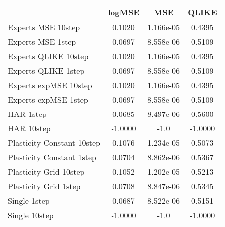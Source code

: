 
\begin{tabular}{l|c|c|c}
    & logMSE & MSE & QLIKE \\\hline
Experts MSE 10step & 0.1020 & 1.166e-05 & 0.4395\\ 
Experts MSE 1step & 0.0697 & 8.558e-06 & 0.5109\\ 
Experts QLIKE 10step & 0.1020 & 1.166e-05 & 0.4395\\ 
Experts QLIKE 1step & 0.0697 & 8.558e-06 & 0.5109\\ 
Experts expMSE 10step & 0.1020 & 1.166e-05 & 0.4395\\ 
Experts expMSE 1step & 0.0697 & 8.558e-06 & 0.5109\\ 
HAR 1step & 0.0685 & 8.497e-06 & 0.5600\\ 
HAR 10step & -1.0000 & -1.0 & -1.0000\\ 
Plasticity Constant 10step & 0.1076 & 1.234e-05 & 0.5073\\ 
Plasticity Constant 1step & 0.0704 & 8.862e-06 & 0.5367\\ 
Plasticity Grid 10step & 0.1052 & 1.202e-05 & 0.5213\\ 
Plasticity Grid 1step & 0.0708 & 8.847e-06 & 0.5345\\ 
Single 1step & 0.0687 & 8.522e-06 & 0.5151\\ 
Single 10step & -1.0000 & -1.0 & -1.0000\\ 
\end{tabular}